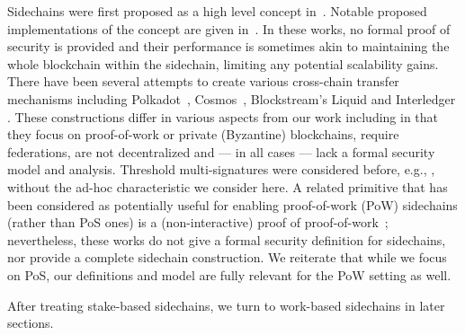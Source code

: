 Sidechains were first proposed as a high level concept in~\cite{sidechains}.
Notable proposed implementations of the concept are given in~\cite{drivechains,lerner}.
In these works, no formal proof of security
is provided and their performance is sometimes akin to maintaining the whole
blockchain within the sidechain, limiting any potential scalability gains.
%
There have been several attempts to create various cross-chain transfer
mechanisms including Polkadot~\cite{polkadot},
Cosmos~\cite{tendermint}, Blockstream's Liquid \cite{federated-interoperability} and Interledger \cite{interledger}. These constructions  differ in various aspects from our work including in that
they focus on proof-of-work or private (Byzantine) blockchains, require
federations, are not decentralized and --- in all cases ---
 lack a formal security model and analysis.
Threshold multi-signatures were considered before, e.g., \cite{pass-asynchronous},
without the ad-hoc characteristic we consider here.
A related primitive that has been considered as potentially useful for enabling
proof-of-work (PoW) sidechains (rather than PoS ones) is a (non-interactive) proof of
proof-of-work~\cite{popow,nipopows}; nevertheless,  these works do not give a
formal security definition for sidechains, nor provide a complete sidechain
construction. We reiterate that while we focus on  PoS, our definitions and model
are fully relevant for the PoW setting as well.

After treating stake-based sidechains, we turn to work-based sidechains in later
sections.
